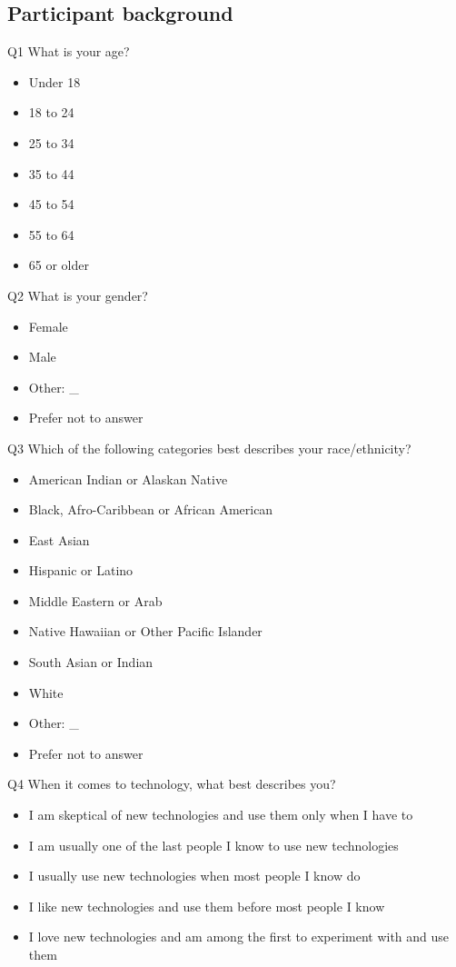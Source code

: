 \documentclass[acmsmall]{acmart}
\begin{document}
\subsection{Participant background}

Q1 What is your age?
\begin{itemize}
\item Under 18  
\item 18 to 24  
\item 25 to 34  
\item 35 to 44   
\item 45 to 54  
\item 55 to 64  
\item 65 or older  
\end{itemize}

Q2 What is your gender?
\begin{itemize}
\item Female  
\item Male  
\item Other:  \_
\item Prefer not to answer   
\end{itemize}

Q3 Which of the following categories best describes your race/ethnicity?
\begin{itemize}
\item American Indian or Alaskan Native   
\item Black, Afro-Caribbean or African American   
\item East Asian   
\item Hispanic or Latino  
\item Middle Eastern or Arab   
\item Native Hawaiian or Other Pacific Islander  
\item South Asian or Indian   
\item White   
\item Other:   \_
\item Prefer not to answer  
\end{itemize}

Q4 When it comes to technology, what best describes you?
\begin{itemize}
\item I am skeptical of new technologies and use them only when I have to 
\item I am usually one of the last people I know to use new technologies  
\item I usually use new technologies when most people I know do  
\item I like new technologies and use them before most people I know  
\item I love new technologies and am among the first to experiment with and use them 
\end{itemize} 
\end{document}
